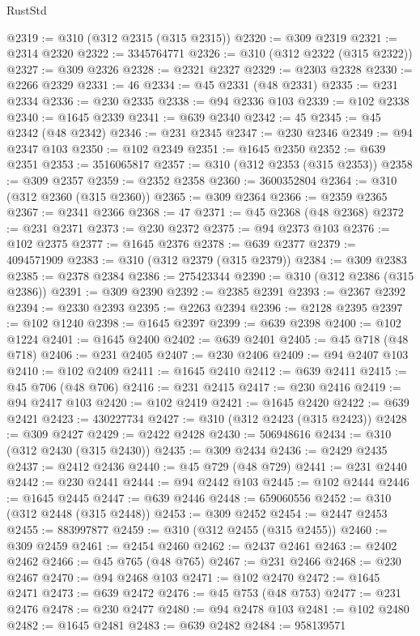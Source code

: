 \begin{lexlean}{RustStd}
\begin{coremodule}
@2319 := @310 (@312 @2315 (@315 @2315))
@2320 := @309 @2319
@2321 := @2314 @2320
@2322 := 3345764771
@2326 := @310 (@312 @2322 (@315 @2322))
@2327 := @309 @2326
@2328 := @2321 @2327
@2329 := @2303 @2328
@2330 := @2266 @2329
@2331 := 46
@2334 := @45 @2331 (@48 @2331)
@2335 := @231 @2334
@2336 := @230 @2335
@2338 := @94 @2336 @103
@2339 := @102 @2338
@2340 := @1645 @2339
@2341 := @639 @2340
@2342 := 45
@2345 := @45 @2342 (@48 @2342)
@2346 := @231 @2345
@2347 := @230 @2346
@2349 := @94 @2347 @103
@2350 := @102 @2349
@2351 := @1645 @2350
@2352 := @639 @2351
@2353 := 3516065817
@2357 := @310 (@312 @2353 (@315 @2353))
@2358 := @309 @2357
@2359 := @2352 @2358
@2360 := 3600352804
@2364 := @310 (@312 @2360 (@315 @2360))
@2365 := @309 @2364
@2366 := @2359 @2365
@2367 := @2341 @2366
@2368 := 47
@2371 := @45 @2368 (@48 @2368)
@2372 := @231 @2371
@2373 := @230 @2372
@2375 := @94 @2373 @103
@2376 := @102 @2375
@2377 := @1645 @2376
@2378 := @639 @2377
@2379 := 4094571909
@2383 := @310 (@312 @2379 (@315 @2379))
@2384 := @309 @2383
@2385 := @2378 @2384
@2386 := 275423344
@2390 := @310 (@312 @2386 (@315 @2386))
@2391 := @309 @2390
@2392 := @2385 @2391
@2393 := @2367 @2392
@2394 := @2330 @2393
@2395 := @2263 @2394
@2396 := @2128 @2395
@2397 := @102 @1240
@2398 := @1645 @2397
@2399 := @639 @2398
@2400 := @102 @1224
@2401 := @1645 @2400
@2402 := @639 @2401
@2405 := @45 @718 (@48 @718)
@2406 := @231 @2405
@2407 := @230 @2406
@2409 := @94 @2407 @103
@2410 := @102 @2409
@2411 := @1645 @2410
@2412 := @639 @2411
@2415 := @45 @706 (@48 @706)
@2416 := @231 @2415
@2417 := @230 @2416
@2419 := @94 @2417 @103
@2420 := @102 @2419
@2421 := @1645 @2420
@2422 := @639 @2421
@2423 := 430227734
@2427 := @310 (@312 @2423 (@315 @2423))
@2428 := @309 @2427
@2429 := @2422 @2428
@2430 := 506948616
@2434 := @310 (@312 @2430 (@315 @2430))
@2435 := @309 @2434
@2436 := @2429 @2435
@2437 := @2412 @2436
@2440 := @45 @729 (@48 @729)
@2441 := @231 @2440
@2442 := @230 @2441
@2444 := @94 @2442 @103
@2445 := @102 @2444
@2446 := @1645 @2445
@2447 := @639 @2446
@2448 := 659060556
@2452 := @310 (@312 @2448 (@315 @2448))
@2453 := @309 @2452
@2454 := @2447 @2453
@2455 := 883997877
@2459 := @310 (@312 @2455 (@315 @2455))
@2460 := @309 @2459
@2461 := @2454 @2460
@2462 := @2437 @2461
@2463 := @2402 @2462
@2466 := @45 @765 (@48 @765)
@2467 := @231 @2466
@2468 := @230 @2467
@2470 := @94 @2468 @103
@2471 := @102 @2470
@2472 := @1645 @2471
@2473 := @639 @2472
@2476 := @45 @753 (@48 @753)
@2477 := @231 @2476
@2478 := @230 @2477
@2480 := @94 @2478 @103
@2481 := @102 @2480
@2482 := @1645 @2481
@2483 := @639 @2482
@2484 := 958139571

\end{coremodule}
\end{lexlean}
